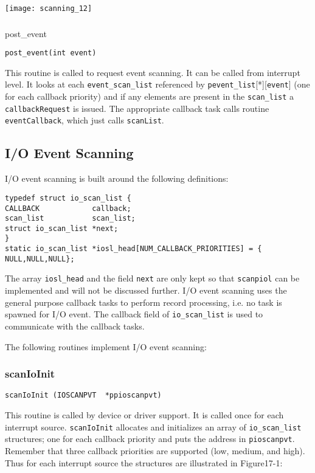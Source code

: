 \texttt{[image: scanning\_12]}

\subsubsection{} post\_event

\begin{verbatim}post_event(int event)
\end{verbatim}This routine is called to request  event scanning. It can be called from interrupt level. It looks at each 
\verb|event_scan_list| referenced by \verb|pevent_list|[*][\verb|event|] (one for each callback priority) and if any elements are 
present in the \verb|scan_list| a \verb|callbackRequest| is issued. The appropriate callback task calls routine 
\verb|eventCallback|, which just calls \verb|scanList|. 

\subsection{I/O Event Scanning}

I/O event scanning is built around the following definitions:

\begin{verbatim}typedef struct io_scan_list {
CALLBACK            callback;
scan_list           scan_list;
struct io_scan_list *next;
}
static io_scan_list *iosl_head[NUM_CALLBACK_PRIORITIES] = {
NULL,NULL,NULL};
\end{verbatim}The array \verb|iosl_head| and the field \verb|next| are only kept so that \verb|scanpiol| can be implemented and will not be discussed 
further. I/O event scanning uses the general purpose callback tasks to perform record processing, i.e. no task is spawned 
for I/O event. The callback field of \verb|io_scan_list| is used to communicate with the callback tasks.

The following routines implement I/O event scanning:

\subsubsection{scanIoInit}

\begin{verbatim}scanIoInit (IOSCANPVT  *ppioscanpvt)
\end{verbatim}This routine is called by device or driver support. It is called once for each interrupt source. \verb|scanIoInit| allocates and 
initializes an array of \verb|io_scan_list| structures; one for each callback priority and puts the address in \verb|pioscanpvt|. 
Remember that three callback priorities are supported (low, medium, and high). Thus for each interrupt source the 
structures are illustrated in Figure17-1:


